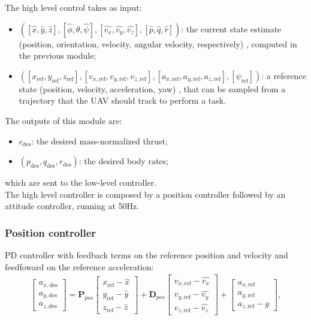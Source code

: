The high level control takes as input: 
\begin{itemize}
\item $([\hat{x},\hat{y},\hat{z}],[\hat{\phi},\hat{\theta},\hat{\psi}],[\hat{v_x},\hat{v_y},\hat{v_z}],[\hat{p},\hat{q},\hat{r}])$: the current state estimate (position, orientation, velocity, angular velocity, respectively) , computed in the previous module;
\item $([x_\mathrm{ref},y_\mathrm{ref},z_\mathrm{ref}],[v_{x,\mathrm{ref}},v_{y,\mathrm{ref}},v_{z,\mathrm{ref}}],[a_{x,\mathrm{ref}},a_{y,\mathrm{ref}},a_{z,\mathrm{ref}}],[\psi_{\mathrm{ref}}])$: a reference state (position, velocity, acceleration, yaw) , that can be sampled from a trajectory that the UAV should track to perform a task.
\end{itemize}
The outputs of this module are:
\begin{itemize}
\item $c_\mathrm{des}$: the desired mass-normalized thrust;
\item $(p_\mathrm{des},q_\mathrm{des},r_\mathrm{des})$: the desired body rates;
\end{itemize}
which are sent to the low-level controller.\\

The high level controller is composed by a position controller followed by an attitude controller, running at 50Hz.

\subsubsection{Position controller}
PD controller with feedback terms on the reference position and velocity and feedfoward on the reference acceleration:
\begin{align}
\begin{bmatrix}
a_{x,\mathrm{des}}  \\[10pt]
a_{y,\mathrm{des}}  \\[10pt]
a_{z,\mathrm{des}}
\end{bmatrix} = \boldsymbol{P}_{pos}
\begin{bmatrix}
x_{\mathrm{ref}} - \hat{x} \\[10pt]
y_{\mathrm{ref}} - \hat{y}  \\[10pt]
z_{\mathrm{ref}} - \hat{z}
\end{bmatrix} + 
\boldsymbol{D}_{pos}
\begin{bmatrix}
v_{x,\mathrm{ref}} - \hat{v_x} \\[10pt]
v_{y,\mathrm{ref}} - \hat{v_y}  \\[10pt]
v_{z,\mathrm{ref}} - \hat{v_z}
\end{bmatrix}
+
\begin{bmatrix}
a_{x,\mathrm{ref}}  \\[10pt]
a_{y,\mathrm{ref}}  \\[10pt]
a_{z,\mathrm{ref}} - g
\end{bmatrix} ,
\label{eq:PDcontroller1}
\end{align}

